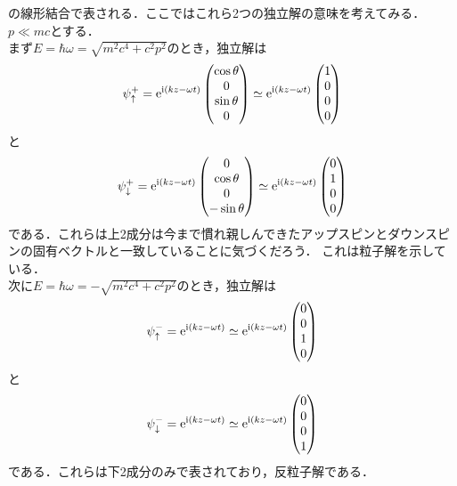 \documentclass{report}
\begin{document}
の線形結合で表される．ここではこれら2つの独立解の意味を考えてみる．$p \ll mc$とする．\\
まず$E=\hbar\omega=\sqrt{m^2c^4 + c^2p^2}$のとき，独立解は
\begin{align}
  \psi_{\uparrow}^{+} = \mathrm{e}^{\mathrm{i}(kz-\omega t)}
  \begin{pmatrix}
    \cos\theta\\0\\\sin\theta\\0
  \end{pmatrix}
  \simeq
  \mathrm{e}^{\mathrm{i}(kz-\omega t)}
  \begin{pmatrix}
    1\\0\\0\\0
  \end{pmatrix}
\end{align}
と
\begin{align}
  \psi_{\downarrow}^{+} = \mathrm{e}^{\mathrm{i}(kz-\omega t)}
  \begin{pmatrix}
    0\\\cos\theta\\0\\-\sin\theta
  \end{pmatrix}
  \simeq
  \mathrm{e}^{\mathrm{i}(kz-\omega t)}
  \begin{pmatrix}
    0\\1\\0\\0
  \end{pmatrix}
\end{align}
である．これらは上2成分は今まで慣れ親しんできたアップスピンとダウンスピンの固有ベクトルと一致していることに気づくだろう．
これは粒子解を示している．\\
次に$E=\hbar\omega=-\sqrt{m^2c^4 + c^2p^2}$のとき，独立解は
\begin{align}
  \psi_{\uparrow}^{-} = \mathrm{e}^{\mathrm{i}(kz-\omega t)}
  \simeq
  \mathrm{e}^{\mathrm{i}(kz-\omega t)}
  \begin{pmatrix}
    0\\0\\1\\0
  \end{pmatrix}
\end{align}
と
\begin{align}
  \psi_{\downarrow}^{-} = \mathrm{e}^{\mathrm{i}(kz-\omega t)}
  \simeq
  \mathrm{e}^{\mathrm{i}(kz-\omega t)}
  \begin{pmatrix}
    0\\0\\0\\1
  \end{pmatrix}
\end{align}
である．これらは下2成分のみで表されており，反粒子解である．
\end{document}
